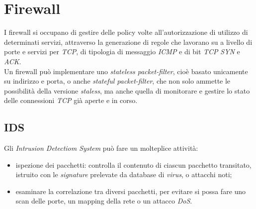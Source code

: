 \section{Firewall}
I firewall si occupano di gestire delle policy volte all'autorizzazione di utilizzo di determinati servizi, attraverso la generazione di regole che lavorano su a livello di porte e servizi per \textit{TCP}, di tipologia di messaggio \textit{ICMP} e di bit \textit{TCP} \textit{SYN} e \textit{ACK}. \\
Un firewall può implementare uno \textit{stateless packet-filter}, cioè basato unicamente su indirizzo e porta, o anche \textit{stateful packet-filter}, che non solo ammette le possibilità della versione \textit{staless}, ma anche quella di monitorare e gestire lo stato delle connessioni \textit{TCP} già aperte e in corso.

\subsection{IDS}
Gli \textit{Intrusion Detectiom System} può fare un molteplice attività:
\begin{itemize}
	\item ispezione dei pacchetti: controlla il contenuto di ciascun pacchetto transitato, istruito con le \textit{signature} prelevate da database di \textit{virus}, o attacchi noti;
	\item esaminare la correlazione tra diversi pacchetti, per evitare si possa fare uno scan delle porte, un mapping della rete o un attacco \textit{DoS}.
\end{itemize}